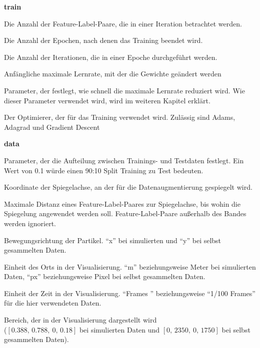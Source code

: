 \newpage
{\Large \sffamily \textbf{train}}

\begin{description}[leftmargin=!,labelwidth=\widthof{\bfseries separatorPosition}, labelindent=0.5cm]
    \item[batchSize] Die Anzahl der Feature-Label-Paare, die in einer Iteration betrachtet werden.
    \item[epochs] Die Anzahl der Epochen, nach denen das Training beendet wird.
    \item[stepsPerEpoch] Die Anzahl der Iterationen, die in einer Epoche durchgeführt werden.  
    \item[learningRate] Anfängliche maximale Lernrate, mit der die Gewichte geändert werden
    \item[decaySteps] Parameter, der festlegt, wie schnell die maximale Lernrate reduziert wird. Wie dieser Parameter verwendet wird, wird im weiteren Kapitel erklärt.
    \item[optimizer] Der Optimierer, der für das Training verwendet wird. Zulässig sind Adams, Adagrad und Gradient Descent
\end{description}

\bigskip
{\Large \sffamily \textbf{data}}
\begin{description}[leftmargin=!,labelwidth=\widthof{\bfseries separatorPosition}, labelindent=0.5cm]
    \item[testSize] Parameter, der die Aufteilung zwischen Trainings- und Testdaten festlegt. Ein Wert von 0.1 würde einen 90:10 Split Training zu Test bedeuten.  
    \item[augmentMidpoint] Koordinate der Spiegelachse, an der für die Datenaugmentierung gespiegelt wird.
    \item[augmentRange] Maximale Distanz eines Feature-Label-Paares zur Spiegelachse, bis wohin die Spiegelung angewendet werden soll. Feature-Label-Paare außerhalb des Bandes werden ignoriert.
    \item[direction] Bewegungsrichtung der Partikel. ``x'' bei simulierten und ``y'' bei selbst gesammelten Daten.
    \item[unitLoc] Einheit des Orts in der Visualisierung. ``m'' beziehungsweise Meter bei simulierten Daten, ``px'' beziehungsweise Pixel bei selbst gesammelten Daten.
    \item[unitTime] Einheit der Zeit in der Visualisierung. ``Frames '' beziehungsweise ``1/100 Frames'' für die hier verwendeten Daten.
    \item[limits] Bereich, der in der Visualisierung dargestellt wird\\ (\([0.388, \, 0.788, \ 0, \, 0.18]\) bei simulierten Daten und \([0,\, 2350, \ 0, \, 1750]\) bei selbst gesammelten Daten).

\end{description}



